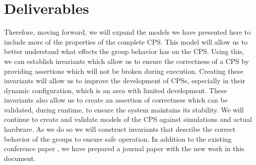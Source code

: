 \section{Deliverables}

Therefore, moving forward, we will expand the models we have presented here to include more of the properties of the complete CPS. This model will allow us to better understand what effects the group behavior has on the CPS. Using this, we can establish invariants which allow us to ensure the correctness of a CPS by providing assertions which will not be broken during execution. Creating these invariants will allow us to improve the development of CPSs, especially in their dynamic configuration, which is an area with limited development. These invariants also allow us to create an assertion of correctness which can be validated, during runtime, to ensure the system maintains its stability. We will continue to create and validate models of the CPS against simulations and actual hardware. As we do so we will construct invariants that describe the correct behavior of the groups to ensure safe operation. In addition to the existing conference paper \cite{CRITIS2012}, we have prepared a journal paper with the new work in this document. 